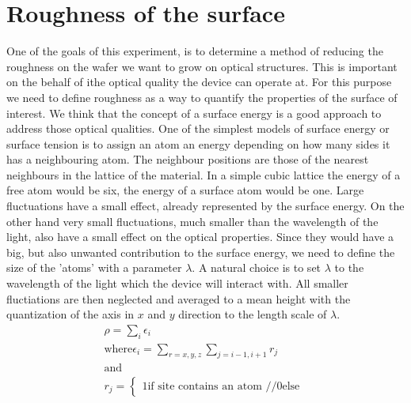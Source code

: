 \section{Roughness of the surface}

One of the goals of this experiment, is to determine a method of reducing the 
roughness on the wafer we want to grow on optical structures. This is important 
on the behalf of ithe optical quality the device can operate at.
For this purpose we need to define roughness as a way to quantify the properties 
of the surface of interest.
We think that the concept of a surface energy is a good approach to address 
those optical qualities. One of the simplest models of surface energy or surface 
tension  is to assign an atom an energy depending on how many sides it has a 
neighbouring atom. The neighbour positions are those of the nearest neighbours 
in the lattice of the material.  In a simple cubic lattice the energy of a free 
atom would be six, the energy of a surface atom would be one.
%
Large fluctuations have a small effect, already represented by the surface 
energy. On the other hand very small fluctuations, much smaller than the 
wavelength of the light, also have a small effect on the optical properties.  
Since they would have a big, but also unwanted contribution to the surface 
energy, we need to define the size of the 'atoms' with a parameter $\lambda$.
A natural choice is to set $\lambda$ to the wavelength of the light which the 
device will interact with. All smaller fluctiations are then neglected and 
averaged to a mean height with the quantization of the axis in $x$ and $y$ 
direction to the length scale of $\lambda$.
\begin{align}
    \rho = \sum_i \epsilon_i \\
    \text{where} \epsilon_i = \sum_{r=x,y,z}\sum_{j=i-1,i+1}r_j \\
    \text{and}  \\
    r_j =   \begin{cases}
                1 \mbox{if  site contains an atom }//
                0 \mbox{else }
            \end{cases}
\end{align}
